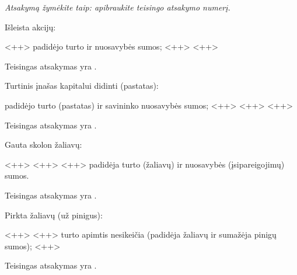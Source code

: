 \begin{tasks}
  
  \emph{Atsakymą žymėkite taip: apibraukite teisingo atsakymo numerį.}

  \begin{task}
    \begin{condition}
      Išleista akcijų:
      \begin{enumerate}
         <++>
         padidėjo turto ir nuosavybės sumos;
         <++>
         <++>
      \end{enumerate}
    \end{condition}
    \begin{solution}
      Teisingas atsakymas yra .
    \end{solution}
  \end{task}

  \begin{task}
    \begin{condition}
      Turtinis įnašas kapitalui didinti (pastatas):
      \begin{enumerate}
         padidėjo turto (pastatas) ir savininko nuosavybės
          sumos;
         <++>
         <++>
         <++>
      \end{enumerate}
    \end{condition}
    \begin{solution}
      Teisingas atsakymas yra .
    \end{solution}
  \end{task}

  \begin{task}
    \begin{condition}
      Gauta skolon žaliavų:
      \begin{enumerate}
         <++>
         <++>
         <++>
         padidėja turto (žaliavų) ir nuosavybės (įsipareigojimų)
          sumos.
      \end{enumerate}
    \end{condition}
    \begin{solution}
      Teisingas atsakymas yra .
    \end{solution}
  \end{task}

  \begin{task}
    \begin{condition}
      Pirkta žaliavų (už pinigus):
      \begin{enumerate}
         <++>
         <++>
         turto apimtis nesikeičia (padidėja žaliavų ir
          sumažėja pinigų sumos);
         <++>
      \end{enumerate}
    \end{condition}
    \begin{solution}
      Teisingas atsakymas yra .
    \end{solution}
  \end{task}


\end{tasks}
